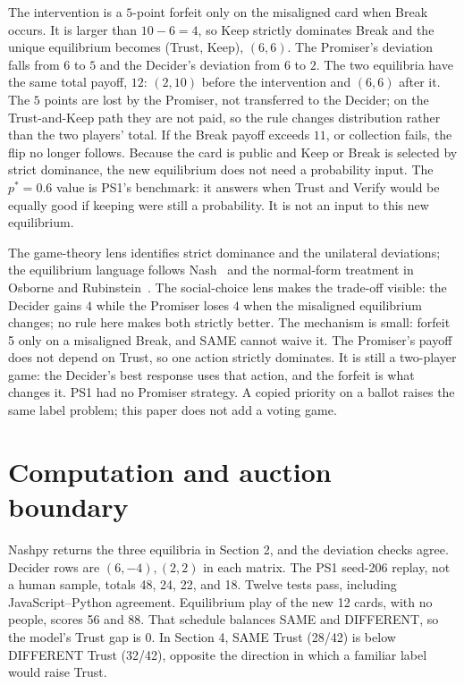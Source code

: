 The intervention is a $5$-point forfeit only on the misaligned card when Break occurs. It is larger than $10-6=4$, so Keep strictly dominates Break and the unique equilibrium becomes (Trust, Keep), $(6,6)$. The Promiser's deviation falls from $6$ to $5$ and the Decider's deviation from $6$ to $2$. The two equilibria have the same total payoff, $12$: $(2,10)$ before the intervention and $(6,6)$ after it. The $5$ points are lost by the Promiser, not transferred to the Decider; on the Trust-and-Keep path they are not paid, so the rule changes distribution rather than the two players' total. If the Break payoff exceeds $11$, or collection fails, the flip no longer follows. Because the card is public and Keep or Break is selected by strict dominance, the new equilibrium does not need a probability input. The $p^\ast=0.6$ value is PS1's benchmark: it answers when Trust and Verify would be equally good if keeping were still a probability. It is not an input to this new equilibrium.

The game-theory lens identifies strict dominance and the unilateral deviations; the equilibrium language follows Nash~\cite{nash1950} and the normal-form treatment in Osborne and Rubinstein~\cite{osborne1994}. The social-choice lens makes the trade-off visible: the Decider gains $4$ while the Promiser loses $4$ when the misaligned equilibrium changes; no rule here makes both strictly better. The mechanism is small: forfeit 5 only on a misaligned Break, and SAME cannot waive it. The Promiser's payoff does not depend on Trust, so one action strictly dominates. It is still a two-player game: the Decider's best response uses that action, and the forfeit is what changes it. PS1 had no Promiser strategy. A copied priority on a ballot raises the same label problem; this paper does not add a voting game.

\section{Computation and auction boundary}
Nashpy returns the three equilibria in Section 2, and the deviation checks agree. Decider rows are $(6,-4),(2,2)$ in each matrix. The PS1 seed-206 replay, not a human sample, totals 48, 24, 22, and 18. Twelve tests pass, including JavaScript--Python agreement. Equilibrium play of the new 12 cards, with no people, scores 56 and 88. That schedule balances SAME and DIFFERENT, so the model's Trust gap is 0. In Section 4, SAME Trust (28/42) is below DIFFERENT Trust (32/42), opposite the direction in which a familiar label would raise Trust.


